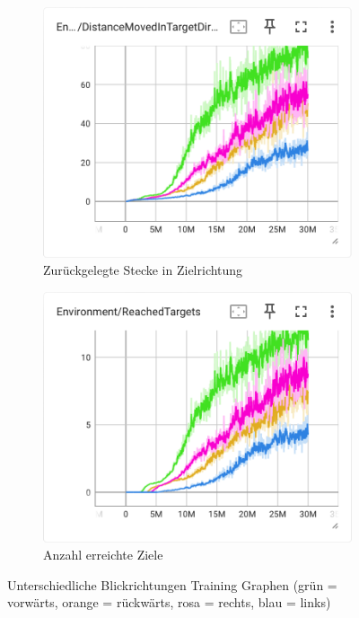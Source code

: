 \begin{figure}[H]
\begin{subfigure}{.49\textwidth}
    \end{subfigure}
    \begin{subfigure}{.49\textwidth}
      \centering  
      \includegraphics[width=\textwidth]{img/116_130_131_132_move_target_dir}
      \caption{Zurückgelegte Stecke in Zielrichtung}
      \label{fig:116_130_131_132_move_target_dir}
    \end{subfigure}
    \begin{subfigure}{.49\textwidth}
      \centering  
      \includegraphics[width=\textwidth]{img/116_130_131_132_reach_target}
      \caption{Anzahl erreichte Ziele}
      \label{fig:116_130_131_132_reach_target}
    \end{subfigure}
  \caption{Unterschiedliche Blickrichtungen Training Graphen (grün = vorwärts, orange = rückwärts, rosa = rechts, blau = links)}
  \label{fig:training_unterschiedliche_blickrichtung}
\end{figure}